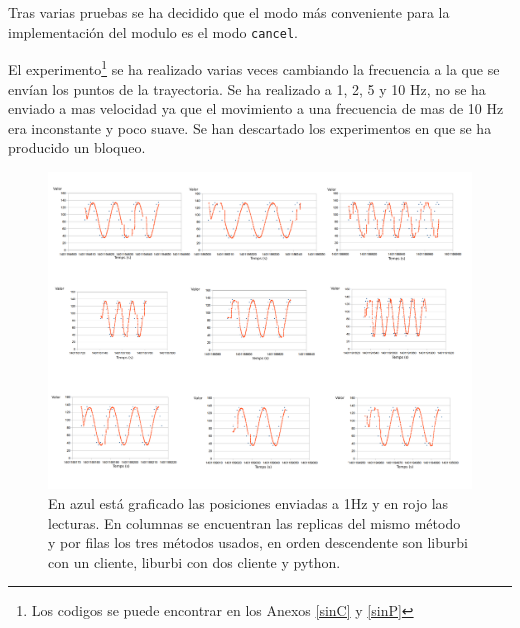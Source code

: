 \documentclass[12pt,a4paper,final,twoside]{book}
\begin{document}
Tras varias pruebas se ha decidido que el modo más conveniente para la implementación del modulo es el modo \texttt{cancel}.

El experimento\footnote{Los codigos se puede encontrar en los Anexos \ref{sinC} y \ref{sinP}} se ha realizado varias veces cambiando la frecuencia a la que se envían los puntos de la trayectoria. Se ha realizado a 1, 2, 5 y 10 Hz, no se ha enviado a mas velocidad ya que el movimiento a una frecuencia de mas de 10 Hz era inconstante y poco suave.
Se han descartado los experimentos en que se ha producido un bloqueo.
 
\begin{figure}[H]
	\centering
    \includegraphics[scale=0.37]{images/sin1H.pdf}
	 \caption{En azul está graficado las posiciones enviadas a 1Hz y en rojo las lecturas. En columnas se encuentran las replicas del mismo método y por filas los tres métodos usados, en orden descendente son liburbi con un cliente, liburbi con dos cliente y python.}
  \label{fig:sin1H}
\end{figure}
\end{document}
